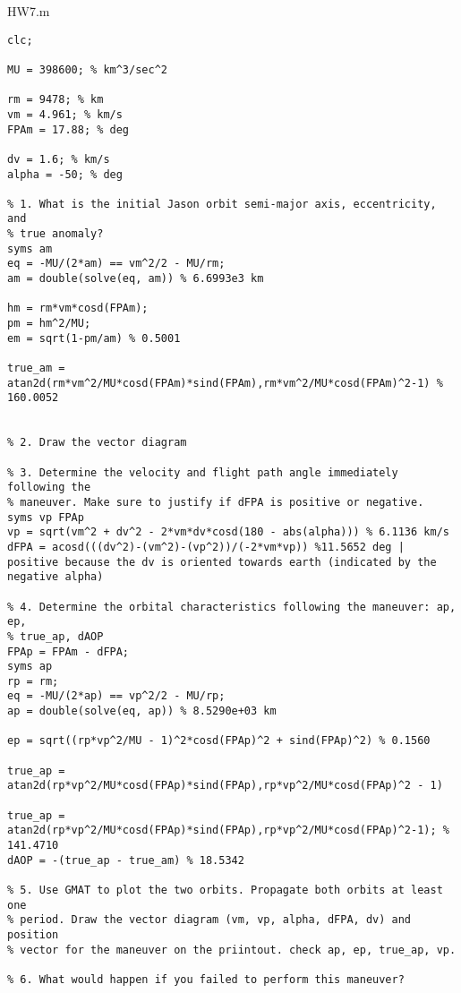 HW7.m
\begin{lstlisting}[frame=lines,style=Matlab-editor,basicstyle = \mlttfamily]
clc;

MU = 398600; % km^3/sec^2

rm = 9478; % km
vm = 4.961; % km/s
FPAm = 17.88; % deg

dv = 1.6; % km/s
alpha = -50; % deg

% 1. What is the initial Jason orbit semi-major axis, eccentricity, and
% true anomaly?
syms am
eq = -MU/(2*am) == vm^2/2 - MU/rm;
am = double(solve(eq, am)) % 6.6993e3 km

hm = rm*vm*cosd(FPAm);
pm = hm^2/MU;
em = sqrt(1-pm/am) % 0.5001

true_am = atan2d(rm*vm^2/MU*cosd(FPAm)*sind(FPAm),rm*vm^2/MU*cosd(FPAm)^2-1) % 160.0052


% 2. Draw the vector diagram

% 3. Determine the velocity and flight path angle immediately following the
% maneuver. Make sure to justify if dFPA is positive or negative.
syms vp FPAp
vp = sqrt(vm^2 + dv^2 - 2*vm*dv*cosd(180 - abs(alpha))) % 6.1136 km/s
dFPA = acosd(((dv^2)-(vm^2)-(vp^2))/(-2*vm*vp)) %11.5652 deg | positive because the dv is oriented towards earth (indicated by the negative alpha)

% 4. Determine the orbital characteristics following the maneuver: ap, ep,
% true_ap, dAOP
FPAp = FPAm - dFPA;
syms ap
rp = rm;
eq = -MU/(2*ap) == vp^2/2 - MU/rp;
ap = double(solve(eq, ap)) % 8.5290e+03 km

ep = sqrt((rp*vp^2/MU - 1)^2*cosd(FPAp)^2 + sind(FPAp)^2) % 0.1560

true_ap = atan2d(rp*vp^2/MU*cosd(FPAp)*sind(FPAp),rp*vp^2/MU*cosd(FPAp)^2 - 1)

true_ap = atan2d(rp*vp^2/MU*cosd(FPAp)*sind(FPAp),rp*vp^2/MU*cosd(FPAp)^2-1); % 141.4710
dAOP = -(true_ap - true_am) % 18.5342

% 5. Use GMAT to plot the two orbits. Propagate both orbits at least one
% period. Draw the vector diagram (vm, vp, alpha, dFPA, dv) and position
% vector for the maneuver on the priintout. check ap, ep, true_ap, vp.

% 6. What would happen if you failed to perform this maneuver?
\end{lstlisting}
